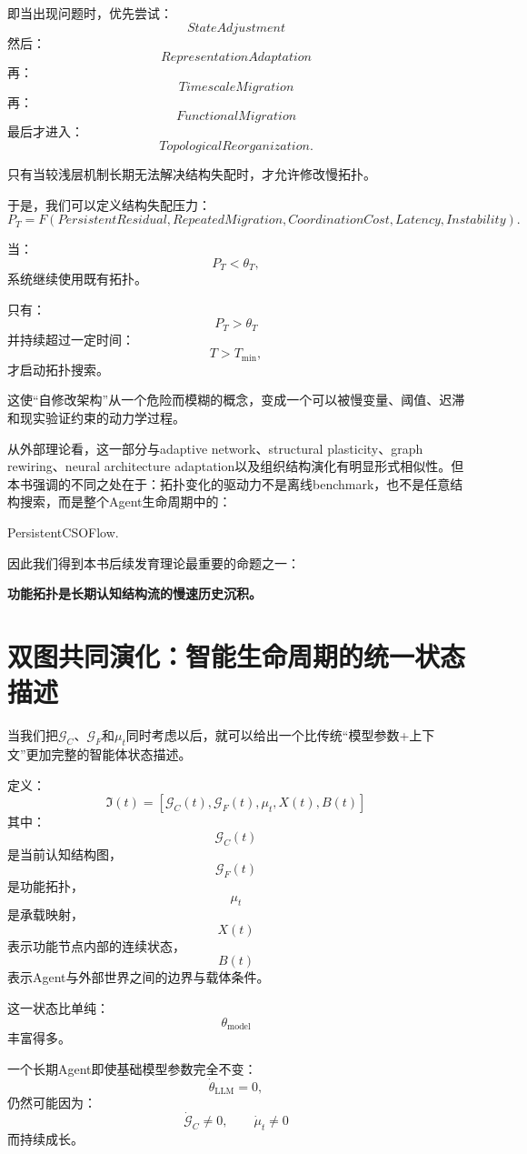 即当出现问题时，优先尝试：
\[
StateAdjustment
\]
然后：
\[
RepresentationAdaptation
\]
再：
\[
TimescaleMigration
\]
再：
\[
FunctionalMigration
\]
最后才进入：
\[
TopologicalReorganization.
\]

只有当较浅层机制长期无法解决结构失配时，才允许修改慢拓扑。

于是，我们可以定义结构失配压力：
\[
P_T
=
F
\left(
PersistentResidual,
RepeatedMigration,
CoordinationCost,
Latency,
Instability
\right).
\]

当：
\[
P_T<\theta_T,
\]
系统继续使用既有拓扑。

只有：
\[
P_T>\theta_T
\]
并持续超过一定时间：
\[
T>T_{\min},
\]
才启动拓扑搜索。

这使“自修改架构”从一个危险而模糊的概念，变成一个可以被慢变量、阈值、迟滞和现实验证约束的动力学过程。

从外部理论看，这一部分与adaptive network、structural plasticity、graph rewiring、neural architecture adaptation以及组织结构演化有明显形式相似性。但本书强调的不同之处在于：拓扑变化的驱动力不是离线benchmark，也不是任意结构搜索，而是整个Agent生命周期中的：
\begin{statementbox}
PersistentCSOFlow.
\end{statementbox}

因此我们得到本书后续发育理论最重要的命题之一：
\begin{proposition*}
\bfseries
功能拓扑是长期认知结构流的慢速历史沉积。
\end{proposition*}

\section{双图共同演化：智能生命周期的统一状态描述}

当我们把$\mathcal G_C$、$\mathcal G_F$和$\mu_t$同时考虑以后，就可以给出一个比传统“模型参数+上下文”更加完整的智能体状态描述。

定义：
\[
\boxed{
\mathfrak I(t)
=
\left[
\mathcal G_C(t),
\mathcal G_F(t),
\mu_t,
X(t),
B(t)
\right]
}
\]
其中：
\[
\mathcal G_C(t)
\]
是当前认知结构图，
\[
\mathcal G_F(t)
\]
是功能拓扑，
\[
\mu_t
\]
是承载映射，
\[
X(t)
\]
表示功能节点内部的连续状态，
\[
B(t)
\]
表示Agent与外部世界之间的边界与载体条件。

这一状态比单纯：
\[
\theta_{\text{model}}
\]
丰富得多。

一个长期Agent即使基础模型参数完全不变：
\[
\dot\theta_{\text{LLM}}=0,
\]
仍然可能因为：
\[
\dot{\mathcal G}_C\neq0,
\qquad
\dot\mu_t\neq0
\]
而持续成长。

